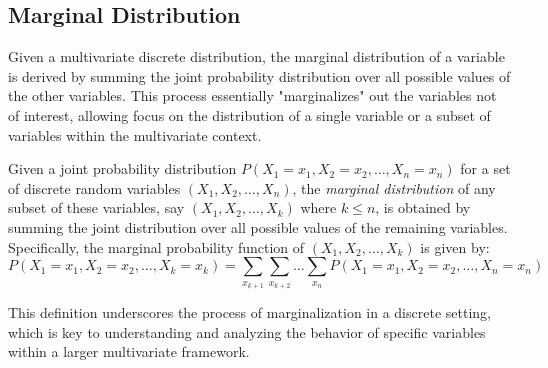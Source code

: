 
\subsection*{Marginal Distribution}

Given a multivariate discrete distribution, the marginal distribution of a variable is derived by summing the joint probability distribution over all possible values of the other variables. This process essentially "marginalizes" out the variables not of interest, allowing focus on the distribution of a single variable or a subset of variables within the multivariate context.

\begin{definition}
Given a joint probability distribution $P(X_1 = x_1, X_2 = x_2, \ldots, X_n = x_n)$ for a set of discrete random variables $(X_1, X_2, \ldots, X_n)$, the \emph{marginal distribution} of any subset of these variables, say $(X_1, X_2, \ldots, X_k)$ where $k \leq n$, is obtained by summing the joint distribution over all possible values of the remaining variables. Specifically, the marginal probability function  of $(X_1, X_2, \ldots, X_k)$ is given by:
\[
P(X_1 = x_1, X_2 = x_2, \ldots, X_k = x_k) = \sum_{x_{k+1}} \sum_{x_{k+2}} \ldots \sum_{x_n} P(X_1 = x_1, X_2 = x_2, \ldots, X_n = x_n)
\]
\end{definition}

This definition underscores the process of marginalization in a discrete setting, which is key to understanding and analyzing the behavior of specific variables within a larger multivariate framework.

